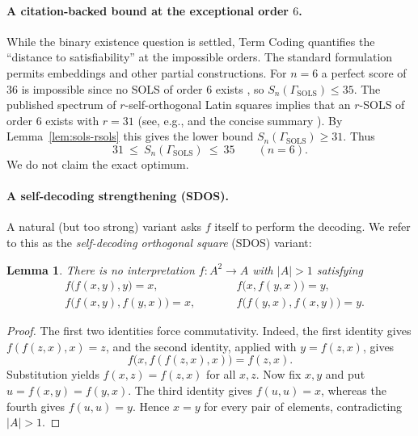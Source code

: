 \documentclass[11pt]{article}
\theoremstyle{plain}
\newtheorem{lemma}[theorem]{Lemma}
\theoremstyle{definition}
\theoremstyle{definition}
\theoremstyle{remark}
\newcommand{\A}{A}
\newcommand{\Sn}{S_n}
\newcommand{\abs}[1]{\left\lvert #1 \right\rvert}
\begin{document}
\paragraph{A citation-backed bound at the exceptional order $6$.}
While the binary existence question is settled, Term Coding quantifies the ``distance to satisfiability'' at the
impossible orders.  The standard formulation permits embeddings and other partial constructions.
For $n=6$ a perfect score of $36$ is impossible since no SOLS of order $6$ exists
\cite{brayton1974self,hedayat1975}, so \(\Sn(\Gamma_{\mathrm{SOLS}})\le 35\).
The published spectrum of $r$-self-orthogonal Latin squares implies that an $r$-SOLS of order $6$ exists
with $r=31$ (see, e.g., \cite{xu2004spectrum,xu2006existence} and the concise summary
\cite[Table~1(b)]{bereg2024computing}).
By Lemma~\ref{lem:sols-rsols} this gives the lower bound \(\Sn(\Gamma_{\mathrm{SOLS}})\ge 31\).
Thus
\[
  31\ \le\ \Sn(\Gamma_{\mathrm{SOLS}})\ \le\ 35\qquad(n=6).
\]
We do not claim the exact optimum.


\paragraph{A self-decoding strengthening (SDOS).}
A natural (but too strong) variant asks $f$ itself to perform the decoding.
We refer to this as the \emph{self-decoding orthogonal square} (SDOS) variant:

\begin{lemma}
\label{lem:sols-strong-unsat}
There is no interpretation $f:\A^2\to\A$ with $\abs{\A}>1$ satisfying
\begin{equation}
\label{eq:sols-strong}
\begin{aligned}
& f\bigl(f(x,y),y\bigr)=x, \qquad
&& f\bigl(x,f(y,x)\bigr)=y,\\[-2pt]
& f\bigl(f(x,y),f(y,x)\bigr)=x,\qquad
&& f\bigl(f(y,x),f(x,y)\bigr)=y.
\end{aligned}
\end{equation}
\end{lemma}

\begin{proof}
The first two identities force commutativity.  Indeed, the first identity gives
$f(f(z,x),x)=z$, and the second identity, applied with $y=f(z,x)$, gives
\[
  f\bigl(x,f(f(z,x),x)\bigr)=f(z,x).
\]
Substitution yields $f(x,z)=f(z,x)$ for all $x,z$.
Now fix $x,y$ and put $u=f(x,y)=f(y,x)$.  The third identity gives $f(u,u)=x$, whereas the fourth gives
$f(u,u)=y$.  Hence $x=y$ for every pair of elements, contradicting $|\A|>1$.
\end{proof}
\end{document}
